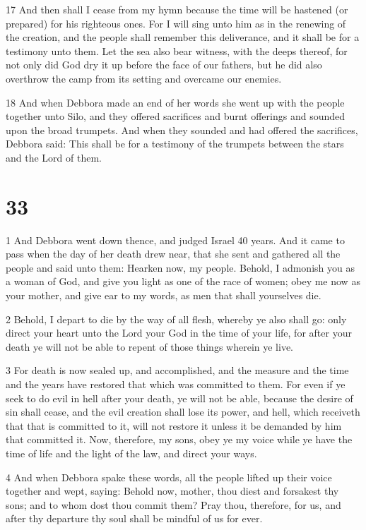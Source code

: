 \par 17 And then shall I cease from my hymn because the time will be hastened (or prepared) for his righteous ones. For I will sing unto him as in the renewing of the creation, and the people shall remember this deliverance, and it shall be for a testimony unto them. Let the sea also bear witness, with the deeps thereof, for not only did God dry it up before the face of our fathers, but he did also overthrow the camp from its setting and overcame our enemies.

\par 18 And when Debbora made an end of her words she went up with the people together unto Silo, and they offered sacrifices and burnt offerings and sounded upon the broad trumpets. And when they sounded and had offered the sacrifices, Debbora said: This shall be for a testimony of the trumpets between the stars and the Lord of them.

\chapter{33}

\par 1 And Debbora went down thence, and judged Israel 40 years. And it came to pass when the day of her death drew near, that she sent and gathered all the people and said unto them: Hearken now, my people. Behold, I admonish you as a woman of God, and give you light as one of the race of women; obey me now as your mother, and give ear to my words, as men that shall yourselves die. 

\par 2 Behold, I depart to die by the way of all flesh, whereby ye also shall go: only direct your heart unto the Lord your God in the time of your life, for after your death ye will not be able to repent of those things wherein ye live. 

\par 3 For death is now sealed up, and accomplished, and the measure and the time and the years have restored that which was committed to them. For even if ye seek to do evil in hell after your death, ye will not be able, because the desire of sin shall cease, and the evil creation shall lose its power, and hell, which receiveth that that is committed to it, will not restore it unless it be demanded by him that committed it. Now, therefore, my sons, obey ye my voice while ye have the time of life and the light of the law, and direct your ways. 

\par 4 And when Debbora spake these words, all the people lifted up their voice together and wept, saying: Behold now, mother, thou diest and forsakest thy sons; and to whom dost thou commit them? Pray thou, therefore, for us, and after thy departure thy soul shall be mindful of us for ever. 

